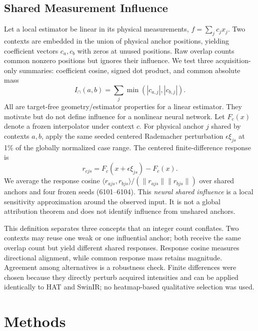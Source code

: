 \documentclass[10pt,twocolumn,letterpaper]{article}
\begin{document}
\subsection{Shared Measurement Influence}
Let a local estimator be linear in its physical measurements, $f=\sum_j c_j x_j$. Two contexts are embedded in the union of physical anchor positions, yielding coefficient vectors $c_a,c_b$ with zeros at unused positions. Raw overlap counts common nonzero positions but ignores their influence. We test three acquisition-only summaries: coefficient cosine, signed dot product, and common absolute mass
\begin{equation}
I_{\cap}(a,b)=\sum_j\min(|c_{a,j}|,|c_{b,j}|). \label{eq:influence}
\end{equation}
All are target-free geometry/estimator properties for a linear estimator. They motivate but do not define influence for a nonlinear neural network. Let $F_c(x)$ denote a frozen interpolator under context $c$. For physical anchor $j$ shared by contexts $a,b$, apply the same seeded centered Rademacher perturbation $\epsilon\xi_{js}$ at 1\% of the globally normalized case range. The centered finite-difference response is
\begin{equation}
r_{cjs}=F_c(x+\epsilon\xi_{js})-F_c(x).
\end{equation}
We average the response cosine $\langle r_{ajs},r_{bjs}\rangle/(\|r_{ajs}\|\|r_{bjs}\|)$ over shared anchors and four frozen seeds (6101--6104). This \emph{neural shared influence} is a local sensitivity approximation around the observed input. It is not a global attribution theorem and does not identify influence from unshared anchors.

This definition separates three concepts that an integer count conflates. Two contexts may reuse one weak or one influential anchor; both receive the same overlap count but yield different shared responses. Response cosine measures directional alignment, while common response mass retains magnitude. Agreement among alternatives is a robustness check. Finite differences were chosen because they directly perturb acquired intensities and can be applied identically to HAT and SwinIR; no heatmap-based qualitative selection was used.

\section{Methods}
\end{document}
